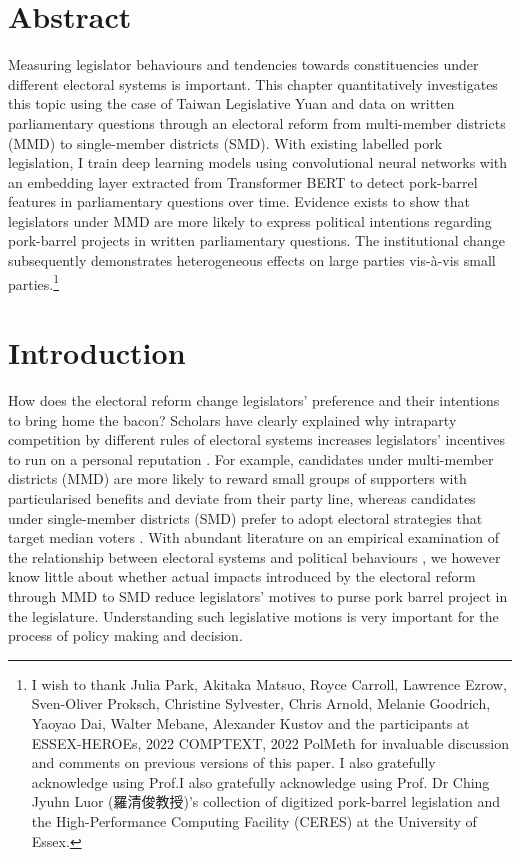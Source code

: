 
\section*{\centering Abstract}
\small Measuring legislator behaviours and tendencies towards constituencies under different electoral systems is important. This chapter quantitatively investigates this topic using the case of Taiwan Legislative Yuan and data on written parliamentary questions through an electoral reform from multi-member districts (MMD) to single-member districts (SMD). With existing labelled pork legislation, I train deep learning models using convolutional neural networks with an embedding layer extracted from Transformer BERT to detect pork-barrel features in parliamentary questions over time. Evidence exists to show that legislators under MMD are more likely to express political intentions regarding pork-barrel projects in written parliamentary questions. The institutional change subsequently demonstrates heterogeneous effects on large parties vis-à-vis small parties.\footnote{I wish to thank Julia Park, Akitaka Matsuo, Royce Carroll, Lawrence Ezrow, Sven-Oliver Proksch, Christine Sylvester, Chris Arnold, Melanie Goodrich, Yaoyao Dai, Walter Mebane, Alexander Kustov and the participants at ESSEX-HEROEs, 2022 COMPTEXT, 2022 PolMeth for invaluable discussion and comments on previous versions of this paper. I also gratefully acknowledge using Prof.I also gratefully acknowledge using Prof. Dr Ching Jyuhn Luor (羅清俊教授)'s collection of digitized pork-barrel legislation and the High-Performance Computing Facility (CERES) at the University of Essex. }  

\clearpage

\section*{\centering Introduction}
How does the electoral reform change legislators' preference and their intentions to bring home the bacon? Scholars have clearly explained why intraparty competition by different rules of electoral systems increases legislators' incentives to run on a personal reputation \citep{Cox1990, Downs1957, Carey1995}. For example, candidates under multi-member districts (MMD) are more likely to reward small groups of supporters with particularised benefits and deviate from their party line, whereas candidates under single-member districts (SMD) prefer to adopt electoral strategies that target median voters \citep{Cox1990}. With abundant literature on an empirical examination of the relationship between electoral systems and political behaviours \citep[e.g.][]{Cox1990, Catalinac2016, Catalinac2017, Goplerud2021}, we however know little about whether actual impacts introduced by the electoral reform through MMD to SMD reduce legislators' motives to purse pork barrel project in the legislature. Understanding such legislative motions is very important for the process of policy making and decision. 

